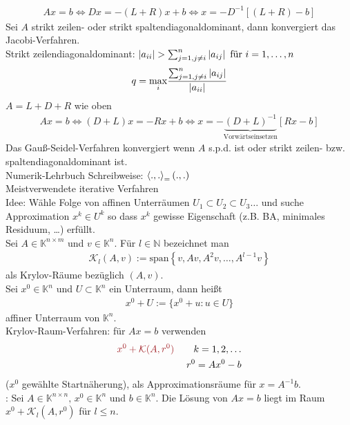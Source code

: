 \begin{align*}
  Ax = b \Leftrightarrow Dx = -(L+R)x + b \Leftrightarrow x = -D^{-1} \left[ (L+R) - b \right]
\end{align*}
\satz Sei $A$ strikt zeilen- oder strikt spaltendiagonaldominant, dann konvergiert das Jacobi-Verfahren.\\
Strikt zeilendiagonaldominant: $\left| a_{ii} \right| > \sum^{n}_{j=1,j \neq i} \left| a_{ij} \right| \text{ für } i=1,\ldots,n$
\begin{align*}
  q = \underset{i}{\max} \frac{\sum^{n}_{j=1,j \neq i} \left| a_{ij} \right|}{\left| a_{ii} \right|}
\end{align*}
$A = L + D + R$ wie oben
\begin{align*}
  Ax = b \Leftrightarrow (D + L)x = -Rx + b \Leftrightarrow x = - \underbrace{(D+L)^{-1}}_{\text{Vorwärtseinsetzen}}[Rx - b]
\end{align*}
\satz Das Gauß-Seidel-Verfahren konvergiert wenn $A$ s.p.d. ist oder strikt zeilen- bzw. spaltendiagonaldominant ist.\\
\beweis Numerik-Lehrbuch
Schreibweise: $\left\langle ., . \right\rangle_ = (.,.)$\\
Meistverwendete iterative Verfahren\\
Idee: Wähle Folge von affinen Unterräumen $U_1 \subset U_2 \subset U_3 \ldots$ und suche 
Approximation $x^k \in U^k$ so dass $x^k$ gewisse Eigenschaft (z.B. BA, minimales Residuum, \ldots) erfüllt.\\
 Sei $A \in \mathbb{K}^{n \times m}$ und $v \in \mathbb{K}^n$. Für $l \in \mathbb{N}$ bezeichnet man
\begin{align*}
  \mathcal{K}_l(A,v) := \mathrm{span} \left \{ v, Av, A^2v, \ldots, A^{l-1}v \right \}
\end{align*}
als Krylov-Räume bezüglich $(A,v)$.\\
 Sei $x^0 \in \mathbb{K}^n$ und $U \subset \mathbb{K}^n$ ein Unterraum, dann heißt
\begin{align*}
  x^0 + U := \{x^0 + u: u \in U\}
\end{align*}
affiner Unterraum von $\mathbb{K}^n$.\\
Krylov-Raum-Verfahren: für $Ax = b$ verwenden
\begin{align*}
  \mathbin{\textcolor{rot}{x^0 + \mathcal{K}(A,r^0)}} \qquad k=1,2,\ldots\\
  r^0 = Ax^0 - b
\end{align*}
($x^0$ gewählte Startnäherung), als Approximationsräume für $x = A^{-1}b$.\\
\satz: Sei $A \in \mathbb{K}^{n \times n},\,x^0 \in \mathbb{K}^n$ und $b \in \mathbb{K}^n$. Die Lösung von
$Ax = b$ liegt im Raum $x^0 + \mathcal{K}_l(A,r^0)$ für $l \leq n$.


















